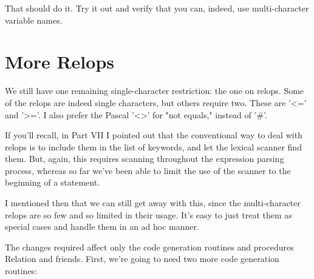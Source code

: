 \documentclass[float=false, crop=false]{standalone}
\begin{document}
That should do it. Try it out and verify that you can, indeed, use
multi-character variable names.


\section{More Relops}

We still have one remaining single-character restriction: the one on relops.
Some of the relops are indeed single characters, but others require two. These
are '<=' and '>='. I also prefer the Pascal '<>' for "not equals," instead of
'#'.

If you'll recall, in Part VII I pointed out that the conventional way to deal
with relops is to include them in the list of keywords, and let the lexical
scanner find them. But, again, this requires scanning throughout the expression
parsing process, whereas so far we've been able to limit the use of the scanner
to the beginning of a statement.

I mentioned then that we can still get away with this, since the multi-character
relops are so few and so limited in their usage. It's easy to just treat them as
special cases and handle them in an ad hoc manner.

The changes required affect only the code generation routines and procedures
Relation and friends. First, we're going to need two more code generation
routines:
\end{document}
